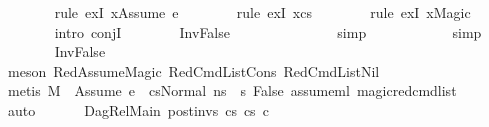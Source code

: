 \begin{isabellebody}
\ \ \ \ \ \ \isamarkupfalse%
\ {\isacharparenleft}{\kern0pt}rule\ exI{\isacharbrackleft}{\kern0pt}\ {\isacharquery}{\kern0pt}x{\isacharequal}{\kern0pt}{\isachardoublequoteopen}{\isacharbrackleft}{\kern0pt}Assume\ e{\isacharbrackright}{\kern0pt}{\isachardoublequoteclose}{\isacharbrackright}{\kern0pt}{\isacharparenright}{\kern0pt}\isanewline
\ \ \ \ \ \ \isamarkupfalse%
\ {\isacharparenleft}{\kern0pt}rule\ exI{\isacharbrackleft}{\kern0pt}\ {\isacharquery}{\kern0pt}x{\isacharequal}{\kern0pt}cs{}{\isacharbrackright}{\kern0pt}{\isacharparenright}{\kern0pt}\isanewline
\ \ \ \ \ \ \isamarkupfalse%
\ {\isacharparenleft}{\kern0pt}rule\ exI{\isacharbrackleft}{\kern0pt}\ {\isacharquery}{\kern0pt}x{\isacharequal}{\kern0pt}Magic{\isacharbrackright}{\kern0pt}{\isacharparenright}{\kern0pt}\isanewline
\ \ \ \ \ \ \isamarkupfalse%
\ {\isacharparenleft}{\kern0pt}intro\ conjI{\isacharparenright}{\kern0pt}\isanewline
\ \ \ \ \ \ \isamarkupfalse%
\ InvFalse\ \isanewline
\ \ \ \ \ \ \ \ \ \ \ \ \isamarkupfalse%
\ simp\isanewline
\ \ \ \ \ \ \ \ \ \ \isamarkupfalse%
\ simp\isanewline
\ \ \ \ \ \ \isamarkupfalse%
\ InvFalse\ \isanewline
\ \ \ \ \ \ \ \ \ \isamarkupfalse%
\ {\isacharparenleft}{\kern0pt}meson\ RedAssumeMagic\ RedCmdListCons\ RedCmdListNil{\isacharparenright}{\kern0pt}\isanewline
\ \ \ \ \ \ \ \ \isamarkupfalse%
\ {\isacharparenleft}{\kern0pt}metis\ {\isacartoucheopen}M{\isacharcomma}{\kern0pt}{\isasymLambda}{\isacharcomma}{\kern0pt}{\isasymGamma}{\isacharcomma}{\kern0pt}{\isasymOmega}\ {\isasymturnstile}\ {\isasymlangle}Assume\ e\ {\isacharhash}{\kern0pt}\ cs{}{\isacharcomma}{\kern0pt}Normal\ ns{}{\isasymrangle}\ {\isacharbrackleft}{\kern0pt}{\isasymrightarrow}{\isacharbrackright}{\kern0pt}\ s{\isacharprime}{\kern0pt}{\isacartoucheclose}\ False\ assume{\isacharunderscore}{\kern0pt}ml\ magic{\isacharunderscore}{\kern0pt}red{\isacharunderscore}{\kern0pt}cmd{\isacharunderscore}{\kern0pt}list{\isacharparenright}{\kern0pt}\isanewline
\ \ \ \ \ \ \isamarkupfalse%
\ auto\isanewline
\ \ \isamarkupfalse%
\isanewline
{}\isamarkupfalse%
\isanewline
\ \ \isamarkupfalse%
\ {\isacharparenleft}{\kern0pt}DagRel{\isacharunderscore}{\kern0pt}Main\ post{\isacharunderscore}{\kern0pt}invs\ cs{}\ cs{}\ c{\isacharparenright}{\kern0pt}\isanewline

\end{isabellebody}
